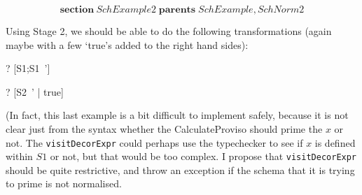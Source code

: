 \documentclass{article}
\newenvironment{zsection}{\[}{\]}
\newcommand{\SECTION}{\textbf{section}~}
\newcommand{\parents}{\mathrel{\textbf{parents}}}
\begin{document}
\begin{zsection}
  \SECTION SchExample2 \parents SchExample, SchNorm2
\end{zsection}

Using Stage 2, we should be able to
do the following transformations (again maybe with a few
`true's added to the right hand sides):

\begin{zed}
\vdash? [S1;S1~'] 
\end{zed}
\begin{zed}
\vdash? [S2~' | true] \unfoldsTo [S1~'; y':\nat | y'<x']
\end{zed}

(In fact, this last example is a bit difficult to implement safely,
because it is not clear just from the syntax whether the CalculateProviso
should prime the $x$ or not.  The \verb!visitDecorExpr! could perhaps
use the typechecker to see if $x$ is defined within $S1$ or not, but
that would be too complex.  I propose that \verb!visitDecorExpr! should
be quite restrictive, and throw an exception if the schema that it
is trying to prime is not normalised.
\end{document}
